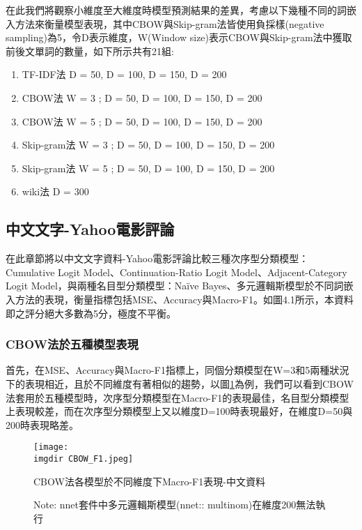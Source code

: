 	在此我們將觀察小維度至大維度時模型預測結果的差異，考慮以下幾種不同的詞嵌入方法來衡量模型表現，其中CBOW與Skip-gram法皆使用負採樣(negative sampling)為5，令D表示維度，W(Window size)表示CBOW與Skip-gram法中獲取前後文單詞的數量，如下所示共有21組:
	
	
\begin{enumerate}[1.]
\setlength{\itemsep}{-10pt}
\item TF-IDF法 D = 50, D = 100, D = 150, D = 200
\item CBOW法 W = 3 ; D = 50, D = 100, D = 150, D = 200
\item CBOW法 W = 5 ; D = 50, D = 100, D = 150, D = 200
\item Skip-gram法 W = 3 ; D = 50, D = 100, D = 150, D = 200
\item Skip-gram法 W = 5 ; D = 50, D = 100, D = 150, D = 200
\item wiki法 D = 300

\end{enumerate}
	
	
\subsection{中文文字-Yahoo電影評論}
	
	在此章節將以中文文字資料-Yahoo電影評論比較三種次序型分類模型：Cumulative Logit Model、Continuation-Ratio Logit Model、Adjacent-Category Logit Model，與兩種名目型分類模型：Naïve Bayes、多元邏輯斯模型於不同詞嵌入方法的表現，衡量指標包括MSE、Accuracy與Macro-F1。如圖4.1所示，本資料即之評分絕大多數為5分，極度不平衡。
	
\subsubsection{CBOW法於五種模型表現}

	首先，在MSE、Accuracy與Macro-F1指標上，同個分類模型在W=3和5兩種狀況下的表現相近，且於不同維度有著相似的趨勢，以圖\ref{pic.5.3.1-1}為例，我們可以看到CBOW法套用於五種模型時，次序型分類模型在Macro-F1的表現最佳，名目型分類模型上表現較差，而在次序型分類模型上又以維度D=100時表現最好，在維度D=50與200時表現略差。	
	
\newpage

\begin{figure}[H]
    \centering
        \texttt{[image: \\imgdir CBOW\_F1.jpeg]}
    \caption{CBOW法各模型於不同維度下Macro-F1表現-中文資料}
    \label{pic.5.3.1-1}
    \caption*{\footnotesize{Note: nnet套件中多元邏輯斯模型(nnet:: multinom)在維度200無法執行}}
\end{figure}
	

